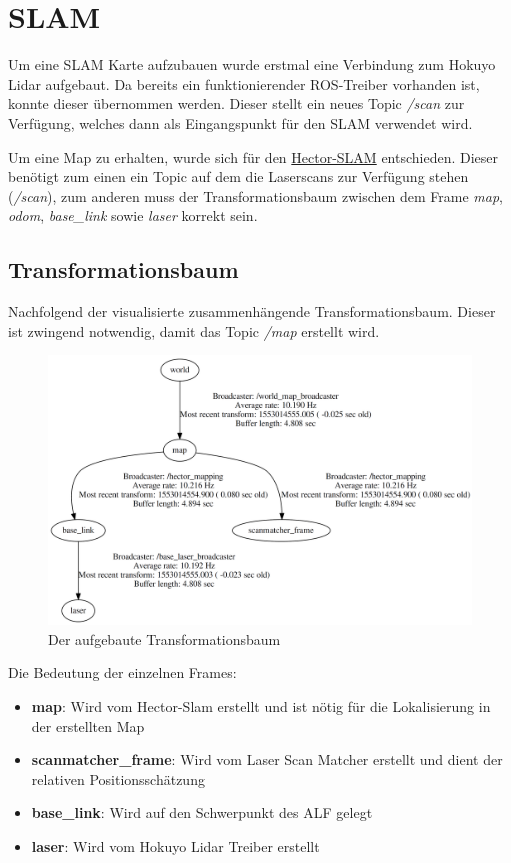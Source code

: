 \section{SLAM}

Um eine SLAM Karte aufzubauen wurde erstmal eine Verbindung zum Hokuyo Lidar aufgebaut. Da bereits ein funktionierender ROS-Treiber vorhanden ist, konnte dieser übernommen werden. Dieser stellt ein neues Topic \textit{/scan} zur Verfügung, welches dann als Eingangspunkt für den SLAM verwendet wird. 

Um eine Map zu erhalten, wurde sich für den \href{http://wiki.ros.org/hector_mapping}{Hector-SLAM} entschieden. Dieser benötigt zum einen ein Topic auf dem die Laserscans zur Verfügung stehen (\textit{/scan}), zum anderen muss der Transformationsbaum zwischen dem Frame \textit{map}, \textit{odom}, \textit{base\_link} sowie \textit{laser} korrekt sein.  




\subsection{Transformationsbaum}

Nachfolgend der visualisierte zusammenhängende Transformationsbaum. Dieser ist zwingend notwendig, damit das Topic \textit{/map} erstellt wird. 


\begin{figure}[hbtp]
\centering
\includegraphics[scale=0.15]{images/chapter5/tf_alf.png}
\caption{Der aufgebaute Transformationsbaum}
\label{fig:tf_alf}
\end{figure}


Die Bedeutung der einzelnen Frames:

\begin{itemize}
\item \textbf{map}: Wird vom Hector-Slam erstellt und ist nötig für die Lokalisierung in der erstellten Map
\item \textbf{scanmatcher\_frame}: Wird vom Laser Scan Matcher erstellt und dient der relativen Positionsschätzung
\item \textbf{base\_link}: Wird auf den Schwerpunkt des ALF gelegt
\item \textbf{laser}: Wird vom Hokuyo Lidar Treiber erstellt
\end{itemize}



